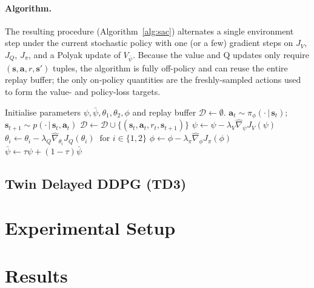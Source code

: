 \documentclass{article}
\begin{document}
\paragraph{Algorithm.}
The resulting procedure (Algorithm~\ref{alg:sac}) alternates a single environment step under the current stochastic policy with one (or a few) gradient steps on $J_V$, $J_Q$, $J_\pi$, and a Polyak update of $V_{\bar\psi}$. Because the value and Q updates only require $(\mathbf{s},\mathbf{a},r,\mathbf{s}')$ tuples, the algorithm is fully off-policy and can reuse the entire replay buffer; the only on-policy quantities are the freshly-sampled actions used to form the value- and policy-loss targets.

\begin{algorithm}[t]
\caption{Soft Actor-Critic \citep{haarnoja2018soft}}
\label{alg:sac}
\begin{algorithmic}
\State Initialise parameters $\psi, \bar\psi, \theta_1, \theta_2, \phi$ and replay buffer $\mathcal{D} \gets \emptyset$.
        \State $\mathbf{a}_t \sim \pi_\phi(\cdot\,|\,\mathbf{s}_t)$;\;
               $\mathbf{s}_{t+1} \sim p(\cdot\,|\,\mathbf{s}_t,\mathbf{a}_t)$
        \State $\mathcal{D} \gets \mathcal{D} \cup \{(\mathbf{s}_t,\mathbf{a}_t,r_t,\mathbf{s}_{t+1})\}$
    \EndFor
        \State $\psi \gets \psi - \lambda_V \hat\nabla_\psi J_V(\psi)$
        \State $\theta_i \gets \theta_i - \lambda_Q \hat\nabla_{\theta_i} J_Q(\theta_i)\;\;\text{for } i \in \{1,2\}$
        \State $\phi \gets \phi - \lambda_\pi \hat\nabla_\phi J_\pi(\phi)$
        \State $\bar\psi \gets \tau \psi + (1-\tau)\bar\psi$
    \EndFor
\EndFor
\end{algorithmic}
\end{algorithm}



\subsection{Twin Delayed DDPG (TD3)}



\section{Experimental Setup}

\section{Results}
\end{document}
